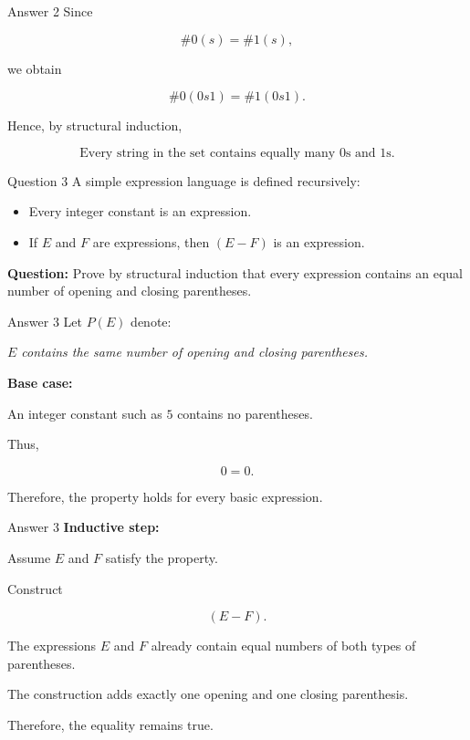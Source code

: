 \begin{frame}{Answer 2}
Since

$$
\#0(s)=\#1(s),
$$

we obtain

$$
\#0(0s1)=\#1(0s1).
$$

Hence, by structural induction,

$$
\boxed{
\text{Every string in the set contains equally many }0\text{s and }1\text{s}.
}
$$

\end{frame}


\begin{frame}{Question 3}
A simple expression language is defined recursively:

\begin{itemize}
\item Every integer constant is an expression.
\item If $E$ and $F$ are expressions, then $(E-F)$ is an expression.
\end{itemize}

\textbf{Question:} Prove by structural induction that every expression contains an equal number of opening and closing parentheses.
\end{frame}

\begin{frame}{Answer 3}
Let $P(E)$ denote:

\textit{$E$ contains the same number of opening and closing parentheses.}

\textbf{Base case:}

An integer constant such as $5$ contains no parentheses.

Thus,

$$
0=0.
$$

Therefore, the property holds for every basic expression.
\end{frame}

\begin{frame}{Answer 3}
\textbf{Inductive step:}

Assume $E$ and $F$ satisfy the property.

Construct

$$
(E-F).
$$

The expressions $E$ and $F$ already contain equal numbers of both types of parentheses.

The construction adds exactly one opening and one closing parenthesis.

Therefore, the equality remains true.
\end{frame}

